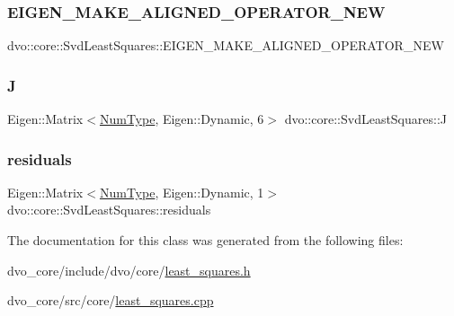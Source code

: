 \subsubsection{\texorpdfstring{E\+I\+G\+E\+N\+\_\+\+M\+A\+K\+E\+\_\+\+A\+L\+I\+G\+N\+E\+D\+\_\+\+O\+P\+E\+R\+A\+T\+O\+R\+\_\+\+N\+EW}{EIGEN\_MAKE\_ALIGNED\_OPERATOR\_NEW}}
{\footnotesize\ttfamily dvo\+::core\+::\+Svd\+Least\+Squares\+::\+E\+I\+G\+E\+N\+\_\+\+M\+A\+K\+E\+\_\+\+A\+L\+I\+G\+N\+E\+D\+\_\+\+O\+P\+E\+R\+A\+T\+O\+R\+\_\+\+N\+EW}

\mbox{\label{classdvo_1_1core_1_1_svd_least_squares_a8c0eaffdf1517bb11cb3fe7425e3274e}} 
\subsubsection{\texorpdfstring{J}{J}}
{\footnotesize\ttfamily Eigen\+::\+Matrix$<$\mbox{\hyperlink{namespacedvo_1_1core_ab9c199d221775a923e2549ad7e15c323}{Num\+Type}}, Eigen\+::\+Dynamic, 6$>$ dvo\+::core\+::\+Svd\+Least\+Squares\+::J}

\mbox{\label{classdvo_1_1core_1_1_svd_least_squares_a8f1cb060b554d4f77da3db4e7146f96b}} 
\subsubsection{\texorpdfstring{residuals}{residuals}}
{\footnotesize\ttfamily Eigen\+::\+Matrix$<$\mbox{\hyperlink{namespacedvo_1_1core_ab9c199d221775a923e2549ad7e15c323}{Num\+Type}}, Eigen\+::\+Dynamic, 1$>$ dvo\+::core\+::\+Svd\+Least\+Squares\+::residuals}



The documentation for this class was generated from the following files\+:\begin{DoxyCompactItemize}
\item 
dvo\+\_\+core/include/dvo/core/\mbox{\hyperlink{least__squares_8h}{least\+\_\+squares.\+h}}\item 
dvo\+\_\+core/src/core/\mbox{\hyperlink{least__squares_8cpp}{least\+\_\+squares.\+cpp}}\end{DoxyCompactItemize}
